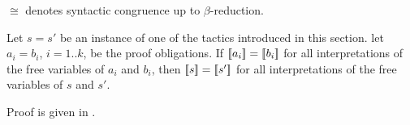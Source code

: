 $\cong$ denotes syntactic congruence up to $\beta$-reduction.

\bigskip
\begin{theorem}
Let $s=s'$ be an instance of one of the tactics introduced in this section.
let $a_i=b_i$, $i=1..k$, be the proof obligations. If $[\![{a_i}]\!]=[\![{b_i}]\!]$
for all interpretations of the free variables of $a_i$ and $b_i$, then
$[\![{s}]\!]=[\![{s'}]\!]$ for all interpretations of the free variables of $s$ and $s'$.
\end{theorem}

Proof is given in .


\newenvironment{tacticbox}[1]{\begin{center}
  \begin{tabular}{|@{~~~~}l@{~~~~}|}\hline
    \rule{0pt}{2.3ex}\underline{\sf \,#1\,}\\[.4em]$}
  {$\\[-1em] \\[.3ex] \hline \end{tabular} \end{center}}

\newenvironment{tacticboxInline}[1]{\begin{tabular}{|@{~~~}l@{~~~}|}\hline
    \rule{0pt}{2.3ex}\underline{\sf \,#1\,}\\[.4em]$}
  {$\\[-1em] \\[.3ex] \hline \end{tabular}}

\newcommand\vtyped[2]{\underset{\scriptscriptstyle ( #2 )}{ #1 }}
\newcommand\htyped[2]{({#1} : {\scriptstyle{#2}})}
\newcommand\htypednp[2]{{#1} : {\scriptstyle{#2}}}

\makeatletter
\newcommand{\quadrants@normal}[4]{
  \renewcommand\arraystretch{1.5}
   \begin{array}{c|c}
     #1 & #2 \\ \hline
     #3 & #4
   \end{array}}
\newcommand{\quadrants@small}[4]{
  \renewcommand\arraystretch{0.9}
   \begin{array}{@{~}c@{~}|@{~}c@{~}}
     \scriptstyle #1 & \scriptstyle #2 \\ \hline
     \scriptstyle #3 & \scriptstyle #4
   \end{array}}
\newcommand\quadrants{\@ifstar\quadrants@small\quadrants@normal}
\makeatother


